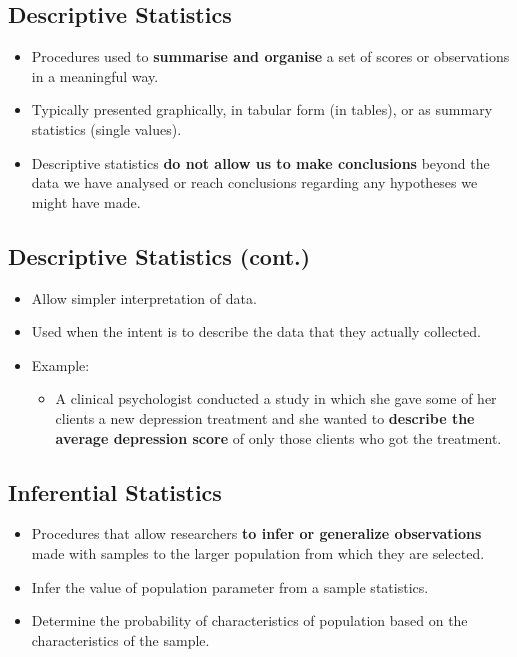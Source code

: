 \documentclass[]{article}
\providecommand{\tightlist}{%
  \setlength{\itemsep}{0pt}\setlength{\parskip}{0pt}}
\begin{document}
\hypertarget{descriptive-statistics}{%
\subsection{Descriptive Statistics}\label{descriptive-statistics}}

\begin{itemize}
\tightlist
\item
  Procedures used to {\textbf{summarise and organise}} a set of scores
  or observations in a meaningful way.
\item
  Typically presented graphically, in tabular form (in tables), or as
  summary statistics (single values).
\item
  Descriptive statistics {\textbf{do not allow us to make conclusions}}
  beyond the data we have analysed or reach conclusions regarding any
  hypotheses we might have made.
\end{itemize}

\hypertarget{descriptive-statistics-cont.}{%
\subsection{Descriptive Statistics
(cont.)}\label{descriptive-statistics-cont.}}

\begin{itemize}
\tightlist
\item
  Allow simpler interpretation of data.
\item
  Used when the intent is to describe the data that they actually
  collected.
\item
  Example:

  \begin{itemize}
  \tightlist
  \item
    A clinical psychologist conducted a study in which she gave some of
    her clients a new depression treatment and she wanted to
    {\textbf{describe the average depression score}} of only those
    clients who got the treatment.
  \end{itemize}
\end{itemize}

\hypertarget{inferential-statistics}{%
\subsection{Inferential Statistics}\label{inferential-statistics}}

\begin{itemize}
\tightlist
\item
  Procedures that allow researchers {\textbf{to infer or generalize
  observations}} made with samples to the larger population from which
  they are selected.
\item
  Infer the value of population parameter from a sample statistics.
\item
  Determine the probability of characteristics of population based on
  the characteristics of the sample.
\end{itemize}
\end{document}
